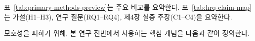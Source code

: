 표~\ref{tab:primary-methods-preview}는 주요 비교를 요약한다. 표~\ref{tab:hrq-claim-map}는 가설(H1--H3), 연구 질문(RQ1--RQ4), 제4장 실증 주장(C1--C4)을 요약한다.

\begin{table}[htbp]
\centering
\caption{주요 비교: EndorseRank 대 AWP (매칭 지갑 코호트, $n=5{,}521$).}
\label{tab:primary-methods-preview}
\end{table}

모호성을 피하기 위해, 본 연구 전반에서 사용하는 핵심 개념을 다음과 같이 정의한다.

